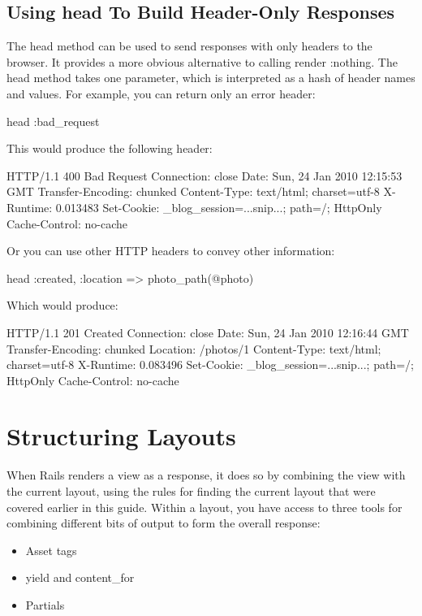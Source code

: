 \documentclass[10pt]{book}
\newenvironment{code}{%
  \scriptsize
    \verbatim
}{%
    \endverbatim
    \newline
}
\begin{document}
\subsection{ Using head To Build Header-Only Responses}

The head method can be used to send responses with only headers to the browser. It provides a more obvious alternative to calling render :nothing. The head  method takes one parameter, which is interpreted as a hash of header  names and values. For example, you can return only an error header:
\begin{code}
head :bad_request
\end{code}

This would produce the following header:
\begin{code}
HTTP/1.1 400 Bad Request
Connection: close
Date: Sun, 24 Jan 2010 12:15:53 GMT
Transfer-Encoding: chunked
Content-Type: text/html; charset=utf-8
X-Runtime: 0.013483
Set-Cookie: _blog_session=...snip...; path=/; HttpOnly
Cache-Control: no-cache
\end{code}

Or you can use other HTTP headers to convey other information:
\begin{code}
head :created, :location => photo_path(@photo)
\end{code}

Which would produce:
\begin{code}
HTTP/1.1 201 Created
Connection: close
Date: Sun, 24 Jan 2010 12:16:44 GMT
Transfer-Encoding: chunked
Location: /photos/1
Content-Type: text/html; charset=utf-8
X-Runtime: 0.083496
Set-Cookie: _blog_session=...snip...; path=/; HttpOnly
Cache-Control: no-cache
\end{code}

\section{ Structuring Layouts}

When Rails renders a view as a response, it does so by combining the  view with the current layout, using the rules for finding the current  layout that were covered earlier in this guide. Within a layout, you  have access to three tools for combining different bits of output to  form the overall response:
\begin{itemize}
	\item Asset tags
	\item yield and content\_for
	\item Partials
\end{itemize}
\end{document}

